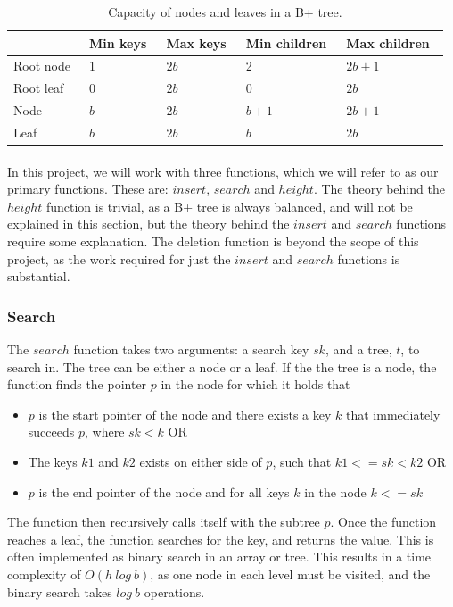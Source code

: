 \begin{table}
\centering
\label{tab:bpluschildren}
\begin{tabular}{| l | l | l | l | l | }
\hline
           & Min keys~ & Max keys~ & Min children~ & Max children~ \\ \hline
Root node~ &  1  & $2b$ &  2    & $2b+1$ \\ \hline
Root leaf  &  0  & $2b$ &  0    & $2b$   \\ \hline
Node       & $b$ & $2b$ & $b+1$ & $2b+1$ \\ \hline
Leaf       & $b$ & $2b$ & $b$   & $2b$   \\ \hline
\end{tabular}
\caption{Capacity of nodes and leaves in a B+ tree.}
\end{table}

\paragraph{}
In this project, we will work with three functions, which we will refer to as our primary functions. These are: $insert$, $search$ and $height$. The theory behind the $height$ function is trivial, as a B+ tree is always balanced, and will not be explained in this section, but the theory behind the $insert$ and $search$ functions require some explanation. The deletion function is beyond the scope of this project, as the work required for just the $insert$ and $search$ functions is substantial.

\subsubsection{Search}
\label{subsec:Search}
The $search$ function takes two arguments: a search key $sk$, and a tree, $t$, to search in. The tree can be either a node or a leaf. If the the tree is a node, the function finds the pointer $p$ in the node for which it holds that
\begin{itemize}
	\item $p$ is the start pointer of the node and there exists a key $k$ that immediately succeeds $p$, where $sk < k$ OR
	\item The keys $k1$ and $k2$ exists on either side of $p$, such that $k1 <= sk < k2$ OR
	\item $p$ is the end pointer of the node and for all keys $k$ in the node $k <= sk$
\end{itemize}
The function then recursively calls itself with the subtree $p$. Once the function reaches a leaf, the function searches for the key, and returns the value. This is often implemented as binary search in an array or tree. This results in a time complexity of $O(h~log~b)$, as one node in each level must be visited, and the binary search takes $log~b$ operations.

